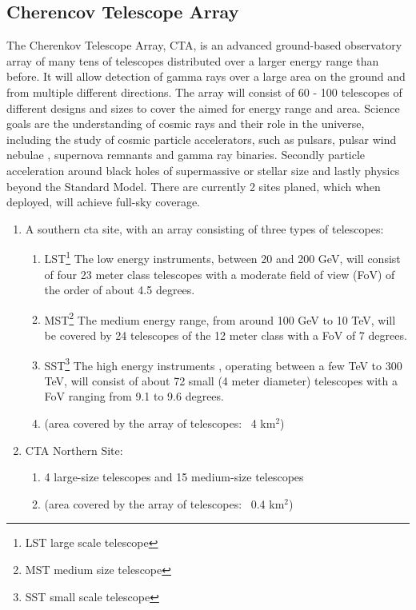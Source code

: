 \documentclass[12pt,article,type=msc,colorback,accentcolor=tud9c]{tudthesis}
\begin{document}
\subsection{Cherencov Telescope Array}



The Cherenkov Telescope Array, CTA, is an advanced ground-based observatory array of many tens of telescopes distributed over a larger energy range than before. It will allow detection of gamma rays over a large area on the ground and from multiple different directions. The array will consist of 60 - 100 telescopes of different designs and sizes to cover the aimed for energy range and area. Science goals are the understanding of cosmic rays and their role in the universe, including the study of cosmic particle accelerators, such as pulsars, pulsar wind nebulae , supernova remnants and gamma ray binaries. Secondly particle acceleration around black holes of supermassive or stellar size and lastly physics beyond the Standard Model. 
There are currently 2 sites planed, which when deployed, will achieve full-sky coverage.
\begin{enumerate}
\item A southern cta site, with an array consisting of three types of telescopes:\\
\begin{enumerate}
\item LST\footnote{LST large scale telescope} The low energy instruments, between 20 and 200 GeV, will consist of four 23 meter class telescopes with a moderate field of view (FoV) of the order of about 4.5 degrees.
\item MST\footnote{MST medium size telescope} The medium energy range, from around 100 GeV to 10 TeV, will be covered by 24 telescopes of the 12 meter class with a FoV of 7 degrees.
\item SST\footnote{SST small scale telescope} The high energy instruments , operating between a few TeV to 300 TeV, will consist of about 72 small (4 meter diameter) telescopes with a FoV ranging from 9.1 to 9.6 degrees.
\item  (area covered by the array of telescopes: ~4 km$^2$)\\
\end{enumerate}
\item CTA Northern Site:
\begin{enumerate} 
\item 4 large-size telescopes and 15 medium-size telescopes
\item (area covered by the array of telescopes: ~0.4 km$^2$)
\end{enumerate}
\end{enumerate}
\end{document}
